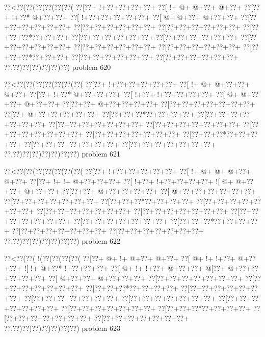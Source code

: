 \vbox{\vbox{\goo
\0??<\0??(\0??(\0??(\0??(\0??(\0??(
\0??[\0??+\- !+\0??+\0??+\0??+\0??+
\0??[\- !+\- @+\- @+\0??+\- @+\0??+
\0??[\0??+\- !+\0??*\- @+\0??+\0??+
\0??[\- !+\0??+\0??+\0??+\0??+\0??+
\0??[\- @+\- @+\0??+\- @+\0??+\0??+
\0??[\0??+\0??+\0??+\0??+\0??+\0??+
\0??[\0??+\0??+\0??+\0??+\0??+\0??+
\0??[\0??+\0??+\0??+\0??+\0??+\0??+
\0??[\0??+\0??+\0??*\0??+\0??+\0??+
\0??[\0??+\0??+\0??+\0??+\0??+\0??+
\0??[\0??+\0??+\0??+\0??+\0??+\0??+
\0??[\0??+\0??+\0??+\0??+\0??+\0??+
\0??[\0??+\0??+\0??+\0??+\0??+\0??+
\0??[\0??+\0??+\0??+\0??+\0??+\0??+
\0??[\0??+\0??+\0??*\0??+\0??+\0??+
\0??[\0??+\0??+\0??+\0??+\0??+\0??+
\0??[\0??+\0??+\0??+\0??+\0??+\0??+
\0??,\0??)\0??)\0??)\0??)\0??)\0??)
}
\hfil problem 620\hfil\break
}

\vbox{\vbox{\goo
\0??<\0??(\0??(\0??(\0??(\0??(\0??(\0??(
\0??[\0??+\- !+\0??+\0??+\0??+\0??+\0??+
\0??[\- !+\- @+\- @+\0??+\0??+\- @+\0??+
\0??[\0??+\- !+\0??*\- @+\0??+\0??+\0??+
\0??[\- !+\0??+\- !+\0??+\0??+\0??+\0??+
\0??[\- @+\- @+\0??+\0??+\- @+\0??+\0??+
\0??[\0??+\0??+\- @+\0??+\0??+\0??+\0??+
\0??[\0??+\0??+\0??+\0??+\0??+\0??+\0??+
\0??[\0??+\- @+\0??+\0??+\0??+\0??+\0??+
\0??[\0??+\0??+\0??*\0??+\0??+\0??+\0??+
\0??[\0??+\0??+\0??+\0??+\0??+\0??+\0??+
\0??[\0??+\0??+\0??+\0??+\0??+\0??+\0??+
\0??[\0??+\0??+\0??+\0??+\0??+\0??+\0??+
\0??[\0??+\0??+\0??+\0??+\0??+\0??+\0??+
\0??[\0??+\0??+\0??+\0??+\0??+\0??+\0??+
\0??[\0??+\0??+\0??*\0??+\0??+\0??+\0??+
\0??[\0??+\0??+\0??+\0??+\0??+\0??+\0??+
\0??[\0??+\0??+\0??+\0??+\0??+\0??+\0??+
\0??,\0??)\0??)\0??)\0??)\0??)\0??)\0??)
}
\hfil problem 621\hfil\break
}

\vbox{\vbox{\goo
\0??<\0??(\0??(\0??(\0??(\0??(\0??(\0??(
\0??[\0??+\- !+\0??+\0??+\0??+\0??+\0??+
\0??[\- !+\- @+\- @+\- @+\0??+\- @+\0??+
\0??[\0??+\- !+\- !+\- @+\0??+\0??+\0??+
\0??[\- !+\0??+\- !+\0??+\0??+\0??+\0??+
\- ![\- @+\- @+\0??+\0??+\- @+\0??+\0??+
\0??[\0??+\0??+\- @+\0??+\0??+\0??+\0??+
\0??[\- @+\0??+\0??+\0??+\0??+\0??+\0??+
\0??[\0??+\0??+\0??+\0??+\0??+\0??+\0??+
\0??[\0??+\0??+\0??*\0??+\0??+\0??+\0??+
\0??[\0??+\0??+\0??+\0??+\0??+\0??+\0??+
\0??[\0??+\0??+\0??+\0??+\0??+\0??+\0??+
\0??[\0??+\0??+\0??+\0??+\0??+\0??+\0??+
\0??[\0??+\0??+\0??+\0??+\0??+\0??+\0??+
\0??[\0??+\0??+\0??+\0??+\0??+\0??+\0??+
\0??[\0??+\0??+\0??*\0??+\0??+\0??+\0??+
\0??[\0??+\0??+\0??+\0??+\0??+\0??+\0??+
\0??[\0??+\0??+\0??+\0??+\0??+\0??+\0??+
\0??,\0??)\0??)\0??)\0??)\0??)\0??)\0??)
}
\hfil problem 622\hfil\break
}

\vbox{\vbox{\goo
\0??<\0??(\0??(\- !(\0??(\0??(\0??(\0??(
\0??[\0??+\- @+\- !+\- @+\0??+\- @+\0??+
\0??[\- @+\- !+\- !+\0??+\- @+\0??+\0??+
\- ![\- !+\- @+\0??*\- !+\0??+\0??+\0??+
\0??[\- @+\- !+\- !+\0??+\- @+\0??+\0??+
\- @[\0??+\- @+\0??+\0??+\0??+\0??+\0??+
\0??[\- @+\0??+\0??+\- @+\0??+\0??+\0??+
\0??[\0??+\0??+\0??+\0??+\0??+\0??+\0??+
\0??[\0??+\0??+\0??+\0??+\0??+\0??+\0??+
\0??[\0??+\0??+\0??*\0??+\0??+\0??+\0??+
\0??[\0??+\0??+\0??+\0??+\0??+\0??+\0??+
\0??[\0??+\0??+\0??+\0??+\0??+\0??+\0??+
\0??[\0??+\0??+\0??+\0??+\0??+\0??+\0??+
\0??[\0??+\0??+\0??+\0??+\0??+\0??+\0??+
\0??[\0??+\0??+\0??+\0??+\0??+\0??+\0??+
\0??[\0??+\0??+\0??*\0??+\0??+\0??+\0??+
\0??[\0??+\0??+\0??+\0??+\0??+\0??+\0??+
\0??[\0??+\0??+\0??+\0??+\0??+\0??+\0??+
\0??,\0??)\0??)\0??)\0??)\0??)\0??)\0??)
}
\hfil problem 623\hfil\break
}


